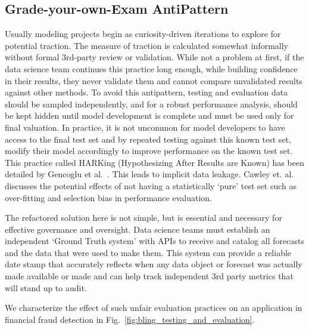 \subsection{Grade-your-own-Exam AntiPattern}\label{sec:testing_and_evaluation}
Usually modeling projects begin as curiosity-driven iterations to explore for potential traction. The measure of traction is calculated somewhat informally without formal 3rd-party review or validation. While not a problem at first, if the data science team continues this practice long enough, while building confidence in their results, they never validate them and cannot compare unvalidated results against other methods. To avoid this antipattern,
testing and evaluation data should be sampled independently, and for a robust performance analysis, should be kept hidden until model development is complete and must be used only for final valuation. 
In practice, it is not
uncommon for
model developers to have access to the final test set and by repeated testing against this known test set, modify their model accordingly to improve performance on the known test set. This practice called HARKing (Hypothesizing After Results are Known) has been detailed by Gencoglu et al.~\cite{gencoglu2019hark}. This leads to implicit data leakage. Cawley et. al.~\cite{cawley} discusses the potential effects of not having a statistically `pure' test set such as over-fitting and selection bias in performance evaluation.

The refactored solution here is not simple, but is essential and necessary for effective governance and oversight. Data science
teams must establish an independent `Ground Truth system' with APIs to receive and catalog all forecasts and the data that were used to make them. This system can provide a reliable date stamp that accurately reflects when any data object or forecast was actually made available or made and can help
track independent 3rd party metrics that will stand up to audit.

\iffalse We characterize the effect of such unfair evaluation practices on an application in financial fraud detection in Fig.~\ref{fig:bling_testing_and_evaluation}.



